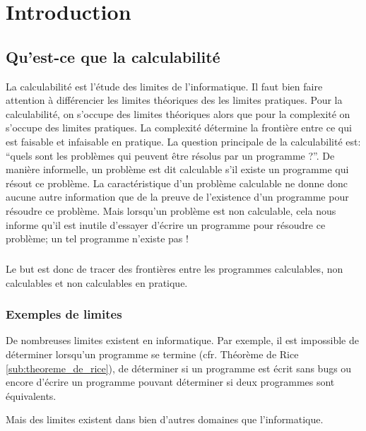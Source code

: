 
\chapter{Introduction}
\label{ch:introduction}

\section{Qu'est-ce que la calculabilité}
\label{sec:qu_est-ce_la_calculabilite}

La calculabilité est l'étude des limites de l'informatique. Il faut bien
faire attention à différencier les limites théoriques des les limites
pratiques. Pour la calculabilité, on s'occupe des limites théoriques alors que pour 
la complexité on s'occupe des limites pratiques. La complexité
détermine la frontière entre ce qui est faisable et infaisable en pratique.
La question principale de la calculabilité est: ``quels sont les problèmes qui peuvent
être résolus par un programme ?''.  De manière informelle, un problème est dit calculable s'il existe un programme qui résout ce problème.  La caractéristique d'un problème calculable ne donne donc aucune 
autre information que de la preuve de l'existence d'un programme pour résoudre ce problème.  Mais lorsqu'un problème est non calculable, cela nous informe qu'il est inutile d'essayer d'écrire un programme pour résoudre ce problème; un tel programme n'existe pas !

\paragraph{} Le but est donc de tracer des frontières entre les programmes calculables,
non calculables et non calculables en pratique.

\subsection{Exemples de limites}
\label{subsec:exemples_limites}

De nombreuses limites existent en informatique. Par exemple, il est impossible de déterminer lorsqu'un programme se termine (cfr. Théorème de Rice \ref{sub:theoreme_de_rice}), de déterminer si un programme est écrit sans bugs ou encore d'écrire un programme pouvant déterminer si deux programmes sont équivalents.

Mais des limites existent dans bien d'autres domaines que l'informatique.
 

